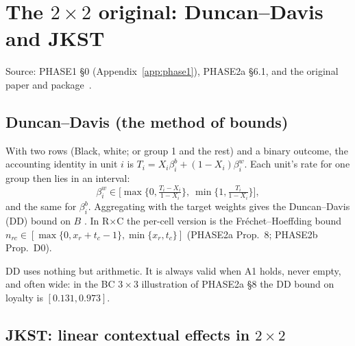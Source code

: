 \section{The $2\times2$ original: Duncan--Davis and JKST}\label{sec:2x2}

Source: PHASE1 \S0 (Appendix~\ref{app:phase1}), PHASE2a \S6.1, and the
original paper and package~\citep{jkst2019,duncan1953}.

\subsection{Duncan--Davis (the method of bounds)}

With two rows (Black, white; or group 1 and the rest) and a binary outcome, the
accounting identity in unit $i$ is $T_i=X_i\beta^b_i+(1-X_i)\beta^w_i$. Each
unit's rate for one group then lies in an interval:
\[
\beta^w_i\in\Big[\max\Big\{0,\tfrac{T_i-X_i}{1-X_i}\Big\},\ \min\Big\{1,\tfrac{T_i}{1-X_i}\Big\}\Big],
\]
and the same for $\beta^b_i$. Aggregating with the target weights gives the
Duncan--Davis (DD) bound on $B$ \citep{duncan1953}. In R$\times$C the per-cell
version is the Fréchet--Hoeffding bound
$n_{rc}\in[\max\{0,x_r+t_c-1\},\min\{x_r,t_c\}]$ (PHASE2a Prop.~8;
PHASE2b Prop.~D0).

\begin{plain}
DD uses nothing but arithmetic. It is always valid when A1 holds, never empty,
and often wide: in the BC $3\times3$ illustration of PHASE2a \S8 the DD bound
on loyalty is $[0.131,0.973]$.
\end{plain}

\subsection{JKST: linear contextual effects in $2\times2$}

